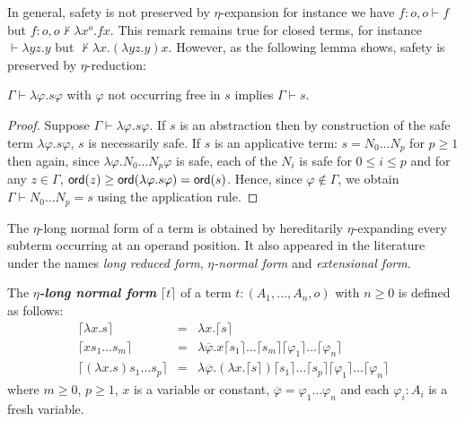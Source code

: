 \documentclass{llncs}
\newcommand\defname[1]{{\bf\em #1}\index{#1}}
\newcommand{\elnf}[1]{\lceil #1\rceil} %
\newcommand\ord[1]{{\sf ord}(#1)}
\begin{document}
In general, safety is not preserved by $\eta$-expansion for instance we have $f:o,o \vdash f$ but $f:o,o \not \vdash \lambda x^o . f x$.
This remark remains true for closed terms, for instance $\vdash \lambda y z . y$ but 
$\not \vdash \lambda x . (\lambda y z . y) x$.
However, as the following lemma shows, safety is preserved by $\eta$-reduction:

\begin{lemma}
$\Gamma \vdash \lambda \varphi . s \varphi $ with $\varphi$ not occurring free in $s$ implies $\Gamma \vdash s$.
\end{lemma}
\begin{proof}
Suppose $\Gamma \vdash \lambda \varphi . s \varphi $. If $s$ is an abstraction then by construction of the safe term $\lambda \varphi . s \varphi$, $s$ is necessarily safe.
If $s$ is an applicative term: $s = N_0 \ldots N_p$ for $p\geq 1$ then again, since $\lambda \varphi . N_0 \ldots N_p \varphi$ is safe, each of the $N_i$ is safe for $0 \leq i \leq p$ and for any $z\in \Gamma$, $\ord{z} \geq \ord{\lambda \varphi . s \varphi} = \ord{s}$. Hence, since $\varphi \not\in \Gamma$, we obtain $\Gamma \vdash N_0 \ldots N_p = s$ using the application rule.
\end{proof}



The $\eta$-long normal form of a term is obtained by hereditarily $\eta$-expanding every
subterm occurring at an operand position.
It also appeared in the literature \cite{DBLP:journals/tcs/JensenP76,DBLP:journals/tcs/Huet75,huet76} under the names \emph{long reduced form}, \emph{$\eta$-normal form} and \emph{extensional form}.

\begin{definition}
The \defname{$\eta$-long normal form} $\elnf{t}$ of a term $t: (A_1,\ldots,A_n,o)$ with $n \geq 0$ is defined as follows:
\begin{eqnarray*}
\elnf{\lambda x . s } &=& \lambda x . \elnf{s} \\
\elnf{x s_1 \ldots s_m } &=& \lambda \overline{\varphi} . x \elnf{s_1}\ldots \elnf{s_m} \elnf{\varphi_1} \ldots \elnf{\varphi_n} \\
\elnf{(\lambda x . s) s_1 \ldots s_p } &=& \lambda \overline{\varphi} . (\lambda x . \elnf{s}) \elnf{s_1} \ldots \elnf{s_p} \elnf{\varphi_1} \ldots \elnf{\varphi_n}
\end{eqnarray*}
where $m \geq 0$, $p\geq 1$, $x$ is a  variable or constant, $\overline{\varphi} = \varphi_1 \ldots \varphi_n$ and each $\varphi_i : A_i$ is a fresh variable.
\end{definition}
\end{document}
